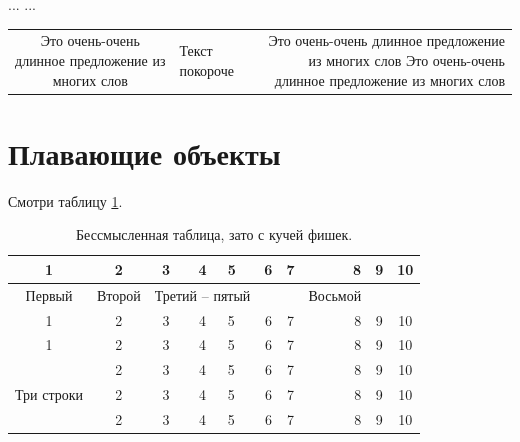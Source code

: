 \documentclass[a4paper,12pt]{article}
\begin{document}
...
...

\begin{tabulary}{\textwidth}{C|J|R}
	\hline
	Это очень-очень длинное предложение из многих слов & Текст покороче & Это очень-очень длинное предложение из многих слов Это очень-очень длинное предложение из многих слов
\end{tabulary}

\section{Плавающие объекты}

Смотри таблицу \ref{tab:mytab}.

\begin{table}[!h]
	\begin{center}
		\caption[Заголовок для списка таблиц]{Бессмысленная таблица, зато с кучей фишек.}\label{tab:mytab}
		\begin{tabular}{|c|c|c|c||l|c|c|r|c|c|}
  		\hline
    	1 & 2 & 3 & 4 & 5 & 6 & 7 & 8 & 9 & 10 \\ \hline
  		Первый & Второй & \multicolumn{3}{|c|}{Третий -- пятый} &   &  & Восьмой &   &  \\ 
		\cline{1-7} \cline{9-10}
   		1 & 2 & 3 & 4 & 5 & 6 & 7 & 8 & 9 & 10 \\ \hline \hline
   		1 & 2 & 3 & 4 & 5 & 6 & 7 & 8 & 9 & 10 \\ \hline
    	\multirow{3}{*}{Три строки}  & 2 & 3 & 4 & 5 & 6 & 7 & 8 & 9 & 10 \\ \cline{2-10}
    	  & 2 & 3 & 4 & 5 & 6 & 7 & 8 & 9 & 10 \\ \cline{2-10}
    	  & 2 & 3 & 4 & 5 & 6 & 7 & 8 & 9 & 10 \\ \hline
		\end{tabular}
	\end{center}
\end{table}
\end{document}
